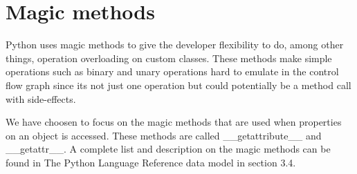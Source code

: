 \section{Magic methods}
Python uses magic methods to give the developer flexibility to do, among other things, operation overloading on custom classes. These methods make simple operations such as binary and unary operations hard to emulate in the control flow graph since its not just one operation but could potentially be a method call with side-effects.

We have choosen to focus on the magic methods that are used when properties on an object is accessed. These methods are called \_\_getattribute\_\_ and \_\_getattr\_\_. A complete list and description on the magic methods can be found in The Python Language Reference data model\cite{pyref.datamodel} in section 3.4.
